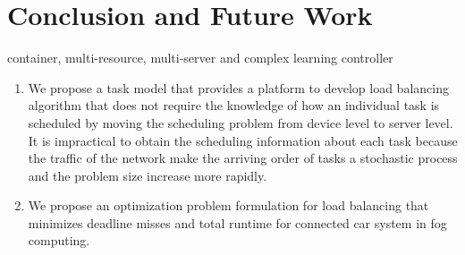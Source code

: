 \section{Conclusion and Future Work}
\label{s5}

\cite{lc2} 

container, multi-resource, multi-server and complex learning controller

\begin{enumerate}

\item We propose a task model that provides a platform to develop load balancing algorithm that does not require the knowledge of how an individual task is scheduled by moving the scheduling problem from device level to server level. It is impractical to obtain the scheduling information about each task because the traffic of the network make the arriving order of tasks a stochastic process and the problem size increase more rapidly.
\item We propose an optimization problem formulation for load balancing that minimizes deadline misses and total runtime for connected car system in fog computing.
\end{enumerate}